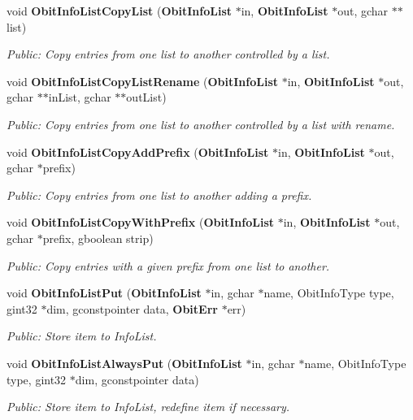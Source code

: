 \begin{CompactItemize}
void {\bf Obit\-Info\-List\-Copy\-List} ({\bf Obit\-Info\-List} $\ast$in, {\bf Obit\-Info\-List} $\ast$out, gchar $\ast$$\ast$list)
\begin{CompactList}\small\item\em Public: Copy entries from one list to another controlled by a list. \item\end{CompactList}\item 
void {\bf Obit\-Info\-List\-Copy\-List\-Rename} ({\bf Obit\-Info\-List} $\ast$in, {\bf Obit\-Info\-List} $\ast$out, gchar $\ast$$\ast$in\-List, gchar $\ast$$\ast$out\-List)
\begin{CompactList}\small\item\em Public: Copy entries from one list to another controlled by a list with rename. \item\end{CompactList}\item 
void {\bf Obit\-Info\-List\-Copy\-Add\-Prefix} ({\bf Obit\-Info\-List} $\ast$in, {\bf Obit\-Info\-List} $\ast$out, gchar $\ast$prefix)
\begin{CompactList}\small\item\em Public: Copy entries from one list to another adding a prefix. \item\end{CompactList}\item 
void {\bf Obit\-Info\-List\-Copy\-With\-Prefix} ({\bf Obit\-Info\-List} $\ast$in, {\bf Obit\-Info\-List} $\ast$out, gchar $\ast$prefix, gboolean strip)
\begin{CompactList}\small\item\em Public: Copy entries with a given prefix from one list to another. \item\end{CompactList}\item 
void {\bf Obit\-Info\-List\-Put} ({\bf Obit\-Info\-List} $\ast$in, gchar $\ast$name, Obit\-Info\-Type type, gint32 $\ast$dim, gconstpointer data, {\bf Obit\-Err} $\ast$err)
\begin{CompactList}\small\item\em Public: Store item to Info\-List. \item\end{CompactList}\item 
void {\bf Obit\-Info\-List\-Always\-Put} ({\bf Obit\-Info\-List} $\ast$in, gchar $\ast$name, Obit\-Info\-Type type, gint32 $\ast$dim, gconstpointer data)
\begin{CompactList}\small\item\em Public: Store item to Info\-List, redefine item if necessary. \item\end{CompactList}\item 
$$
\end{CompactItemize}

